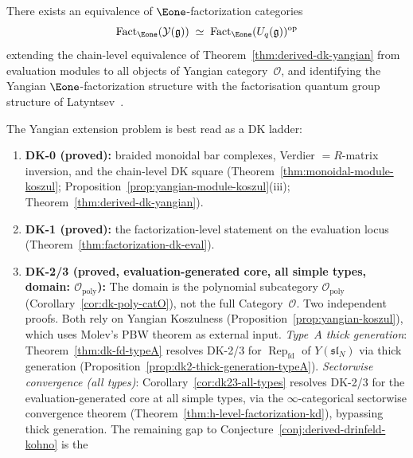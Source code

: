 \begin{conjecture}
\label{conj:derived-drinfeld-kohno}
There exists an equivalence of $\Eone$-factorization categories
\[
\operatorname{Fact}_{\Eone}(\mathcal{Y}(\mathfrak{g}))
\;\simeq\;
\operatorname{Fact}_{\Eone}(U_q(\mathfrak{g}))^{\mathrm{op}}
\]
extending the chain-level equivalence of
Theorem~\textup{\ref{thm:derived-dk-yangian}}
from evaluation modules to all objects of Yangian
category~$\mathcal{O}$, and identifying the Yangian
$\Eone$-factorization structure with the factorisation quantum
group structure of Latyntsev~\cite{Latyntsev23}.
\end{conjecture}

\begin{remark}\label{rem:derived-dk-scope}
The Yangian extension problem is best read as a DK ladder:
\begin{enumerate}[label=\textup{(\alph*)}]
\item \textbf{DK-0 (proved):} braided monoidal bar complexes,
  Verdier $= R$-matrix inversion, and the chain-level DK square
  (Theorem~\ref{thm:monoidal-module-koszul};
  Proposition~\ref{prop:yangian-module-koszul}(iii);
  Theorem~\ref{thm:derived-dk-yangian}).
\item \textbf{DK-1 (proved):} the factorization-level statement on the
  evaluation locus (Theorem~\ref{thm:factorization-dk-eval}).
\item \textbf{DK-2/3 (proved, evaluation-generated core, all simple types, domain: $\mathcal{O}_{\mathrm{poly}}$):}
  The domain is the polynomial subcategory
  $\mathcal{O}_{\mathrm{poly}}$
  (Corollary~\ref{cor:dk-poly-catO}), not the full
  Category~$\mathcal{O}$.
  Two independent proofs.  Both rely on Yangian Koszulness
  (Proposition~\ref{prop:yangian-koszul}), which uses Molev's PBW
  theorem \cite{molev-yangians} as external input.
  \emph{Type~$A$ thick generation}:
  Theorem~\ref{thm:dk-fd-typeA} resolves DK-2/3 for
  $\operatorname{Rep}_{\mathrm{fd}}$ of $Y(\mathfrak{sl}_N)$
  via thick generation
  (Proposition~\ref{prop:dk2-thick-generation-typeA}).
  \emph{Sectorwise convergence (all types)}:
  Corollary~\ref{cor:dk23-all-types} resolves DK-2/3
  for the evaluation-generated core at all
  simple types, via the $\infty$-categorical sectorwise
  convergence theorem
  (Theorem~\ref{thm:h-level-factorization-kd}), bypassing
  thick generation.  The remaining gap to
  Conjecture~\ref{conj:derived-drinfeld-kohno} is the

\end{enumerate}
\end{remark}
